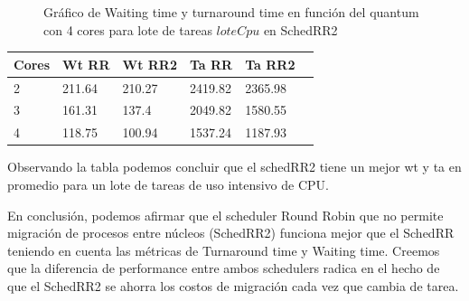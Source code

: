 \begin{figure}[H]
\hfill
{}
\hfill
{}
\hfill
\caption{Gráfico de Waiting time y turnaround time en función del quantum con 4 cores para lote de tareas $loteCpu$ en SchedRR2}
\end{figure}

\begin{center}
    \begin{tabular}{ | l | l | l | l | l | p{5cm} |}
    \hline
    Cores & Wt RR & Wt RR2 & Ta RR & Ta RR2 \\ \hline
    2 & 211.64 & 210.27 & 2419.82 & 2365.98 \\ \hline
    3 & 161.31 & 137.4 & 2049.82 & 1580.55 \\ \hline
    4 & 118.75 & 100.94 & 1537.24 & 1187.93 \\
	\hline
    \end{tabular}
\end{center}

Observando la tabla podemos concluir que el schedRR2 tiene un mejor wt y ta en promedio para un lote de tareas de uso intensivo de CPU.

En conclusión, podemos afirmar que el scheduler Round Robin que no permite migración de procesos entre núcleos (SchedRR2) funciona mejor que el SchedRR teniendo en cuenta las métricas de Turnaround time y Waiting time. Creemos que la diferencia de performance entre ambos schedulers radica en el hecho de que el SchedRR2 se ahorra los costos de migración cada vez que cambia de tarea.

